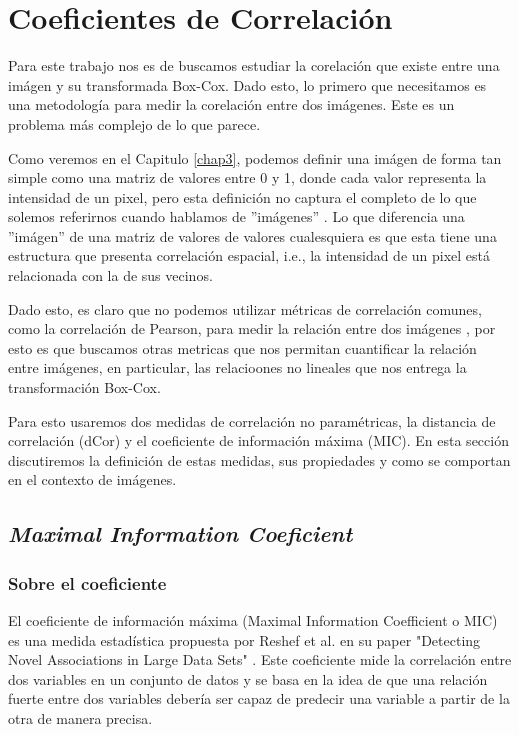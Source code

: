 \chapter{Coeficientes de Correlaci\'on}\label{chap2}
        
    Para este trabajo nos es de buscamos estudiar la corelaci\'on que existe entre una im\'agen y su transformada Box-Cox. Dado esto, lo primero que necesitamos es una metodolog\'ia para medir la corelaci\'on entre dos im\'agenes. Este es un problema m\'as complejo de lo que parece. 

    Como veremos en el Capitulo \ref{chap3}, podemos definir una im\'agen de forma tan simple como una matriz de valores entre 0 y 1, donde cada valor representa la intensidad de un pixel, pero esta definici\'on no captura el completo de lo que solemos referirnos cuando hablamos de ''im\'agenes'' . Lo que diferencia una ''im\'agen'' de una matriz de valores de valores cualesquiera es que esta tiene una estructura que presenta correlaci\'on espacial, i.e., la intensidad de un pixel est\'a relacionada con la de sus vecinos.

    Dado esto, es claro que no podemos utilizar m\'etricas de correlaci\'on comunes, como la correlaci\'on de Pearson, para medir la relaci\'on entre dos im\'agenes \cite{personbad}, por esto es que buscamos otras metricas que nos permitan cuantificar la relaci\'on entre im\'agenes, en particular, las relacioones no lineales que nos entrega la transformaci\'on Box-Cox.

    Para esto usaremos dos medidas de correlaci\'on no param\'etricas, la distancia de correlaci\'on (dCor) y el coeficiente de informaci\'on m\'axima (MIC). En esta secci\'on discutiremos la definici\'on de estas medidas, sus propiedades y como se comportan en el contexto de im\'agenes.

    \section{\textit{Maximal Information Coeficient}} 
    
    \subsection{Sobre el coeficiente}
    
        El coeficiente de informaci\'on m\'axima (Maximal Information Coefficient o MIC) es una medida estad\'istica propuesta por Reshef et al. en su paper "Detecting Novel Associations in Large Data Sets" \cite{Reshef2011}. Este coeficiente mide la correlaci\'on entre dos variables en un conjunto de datos y se basa en la idea de que una relaci\'on fuerte entre dos variables deber\'ia ser capaz de predecir una variable a partir de la otra de manera precisa.
    
